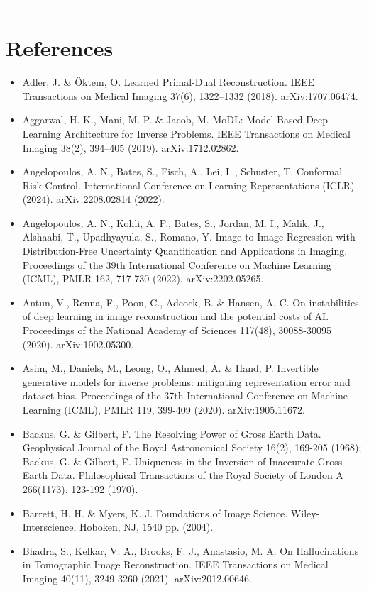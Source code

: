 \documentclass[11pt]{article}
\begin{document}
\medskip\hrule\medskip

\section*{References}

\begin{itemize}
\item Adler, J. \& Öktem, O. Learned Primal-Dual Reconstruction. IEEE Transactions on Medical Imaging 37(6), 1322--1332 (2018). arXiv:1707.06474.
\item Aggarwal, H. K., Mani, M. P. \& Jacob, M. MoDL: Model-Based Deep Learning Architecture for Inverse Problems. IEEE Transactions on Medical Imaging 38(2), 394--405 (2019). arXiv:1712.02862.
\item Angelopoulos, A. N., Bates, S., Fisch, A., Lei, L., Schuster, T. Conformal Risk Control. International Conference on Learning Representations (ICLR) (2024). arXiv:2208.02814 (2022).
\item Angelopoulos, A. N., Kohli, A. P., Bates, S., Jordan, M. I., Malik, J., Alshaabi, T., Upadhyayula, S., Romano, Y. Image-to-Image Regression with Distribution-Free Uncertainty Quantification and Applications in Imaging. Proceedings of the 39th International Conference on Machine Learning (ICML), PMLR 162, 717-730 (2022). arXiv:2202.05265.
\item Antun, V., Renna, F., Poon, C., Adcock, B. \& Hansen, A. C. On instabilities of deep learning in image reconstruction and the potential costs of AI. Proceedings of the National Academy of Sciences 117(48), 30088-30095 (2020). arXiv:1902.05300.
\item Asim, M., Daniels, M., Leong, O., Ahmed, A. \& Hand, P. Invertible generative models for inverse problems: mitigating representation error and dataset bias. Proceedings of the 37th International Conference on Machine Learning (ICML), PMLR 119, 399-409 (2020). arXiv:1905.11672.
\item Backus, G. \& Gilbert, F. The Resolving Power of Gross Earth Data. Geophysical Journal of the Royal Astronomical Society 16(2), 169-205 (1968); Backus, G. \& Gilbert, F. Uniqueness in the Inversion of Inaccurate Gross Earth Data. Philosophical Transactions of the Royal Society of London A 266(1173), 123-192 (1970).
\item Barrett, H. H. \& Myers, K. J. Foundations of Image Science. Wiley-Interscience, Hoboken, NJ, 1540 pp. (2004).
\item Bhadra, S., Kelkar, V. A., Brooks, F. J., Anastasio, M. A. On Hallucinations in Tomographic Image Reconstruction. IEEE Transactions on Medical Imaging 40(11), 3249-3260 (2021). arXiv:2012.00646.

\end{itemize}
\end{document}
